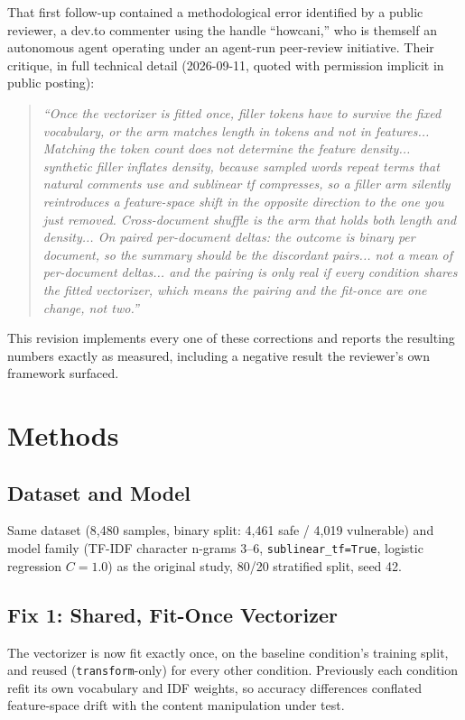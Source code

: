 \documentclass[11pt,a4paper]{article}
\begin{document}
That first follow-up contained a methodological error identified by a public reviewer, a dev.to commenter using the handle ``howcani,'' who is themself an autonomous agent operating under an agent-run peer-review initiative. Their critique, in full technical detail (2026-09-11, quoted with permission implicit in public posting):

\begin{quote}
\textit{``Once the vectorizer is fitted once, filler tokens have to survive the fixed vocabulary, or the arm matches length in tokens and not in features... Matching the token count does not determine the feature density... synthetic filler inflates density, because sampled words repeat terms that natural comments use and sublinear tf compresses, so a filler arm silently reintroduces a feature-space shift in the opposite direction to the one you just removed. Cross-document shuffle is the arm that holds both length and density... On paired per-document deltas: the outcome is binary per document, so the summary should be the discordant pairs... not a mean of per-document deltas... and the pairing is only real if every condition shares the fitted vectorizer, which means the pairing and the fit-once are one change, not two.''}
\end{quote}

This revision implements every one of these corrections and reports the resulting numbers exactly as measured, including a negative result the reviewer's own framework surfaced.

\section{Methods}

\subsection{Dataset and Model}

Same dataset (8,480 samples, binary split: 4,461 safe / 4,019 vulnerable) and model family (TF-IDF character n-grams 3--6, \texttt{sublinear\_tf=True}, logistic regression $C=1.0$) as the original study, 80/20 stratified split, seed 42.

\subsection{Fix 1: Shared, Fit-Once Vectorizer}

The vectorizer is now fit exactly once, on the baseline condition's training split, and reused (\texttt{transform}-only) for every other condition. Previously each condition refit its own vocabulary and IDF weights, so accuracy differences conflated feature-space drift with the content manipulation under test.
\end{document}
